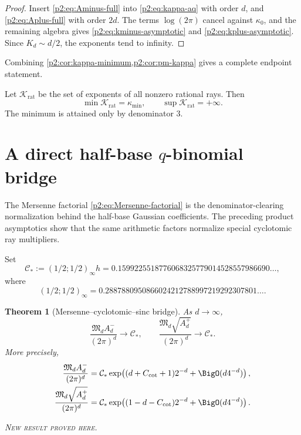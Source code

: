 \documentclass[11pt,oneside]{article}
\newtheorem{theorem}{Theorem}[section]
\theoremstyle{definition}
\theoremstyle{remark}
\newcommand{\newresult}{\textcolor{newgreen}{\textsc{New result proved here.}}}
\begin{document}
\begin{proof}
Insert \eqref{p2:eq:Aminus-full} into \eqref{p2:eq:kappa-aq} with order $d$, and
\eqref{p2:eq:Aplus-full} with order $2d$. The terms $\log(2\pi)$ cancel against
$\kappa_0$, and the remaining algebra gives \eqref{p2:eq:kminus-asymptotic} and
\eqref{p2:eq:kplus-asymptotic}. Since $K_d\sim d/2$, the exponents tend to infinity.
\end{proof}

Combining \cref{p2:cor:kappa-minimum,p2:cor:pm-kappa} gives a complete endpoint statement.

\begin{corollary}\label{p2:cor:spectrum-endpoints}
Let $\mathcal K_{\mathrm{rat}}$ be the set of exponents of all nonzero rational
rays. Then
\begin{equation}
 \min\mathcal K_{\mathrm{rat}}=\kappa_{\min},
 \qquad
 \sup\mathcal K_{\mathrm{rat}}=+\infty.
 \label{p2:eq:spectrum-endpoints}
\end{equation}
The minimum is attained only by denominator $3$.
\end{corollary}

\section{A direct half-base $q$-binomial bridge}\label{p2:sec:qbridge}

The Mersenne factorial \eqref{p2:eq:Mersenne-factorial} is the denominator-clearing
normalization behind the half-base Gaussian coefficients. The preceding product
asymptotics show that the same arithmetic factors normalize special cyclotomic
ray multipliers.

Set
\begin{equation}
 \mathcal C_*:=(1/2;1/2)_\infty h
 =0.1599225518776068325779014528557986690\ldots,
 \label{p2:eq:Cstar}
\end{equation}
where
\begin{equation}
 (1/2;1/2)_\infty
 =0.2887880950866024212788997219292307801\ldots.
 \label{p2:eq:qpoch-number}
\end{equation}

\begin{theorem}[Mersenne--cyclotomic--sinc bridge]\label{p2:thm:qbridge}
As $d\to\infty$,
\begin{equation}
 \boxed{
 \frac{\mathfrak M_dA_d^-}{(2\pi)^d}\longrightarrow\mathcal C_*},
 \qquad
 \boxed{
 \frac{\mathfrak M_d\sqrt{A_d^+}}{(2\pi)^d}\longrightarrow\mathcal C_*}.
 \label{p2:eq:qbridge-limits}
\end{equation}
More precisely,
\begin{align}
 \frac{\mathfrak M_dA_d^-}{(2\pi)^d}
 &=\mathcal C_*
 \exp\!\left((d+C_{\cot}+1)2^{-d}+\BigO(d4^{-d})\right),
 \label{p2:eq:qbridge-minus-refined}\\
 \frac{\mathfrak M_d\sqrt{A_d^+}}{(2\pi)^d}
 &=\mathcal C_*
 \exp\!\left((1-d-C_{\cot})2^{-d}+\BigO(d4^{-d})\right).
 \label{p2:eq:qbridge-plus-refined}
\end{align}

\smallskip\noindent\newresult
\end{theorem}
\end{document}
